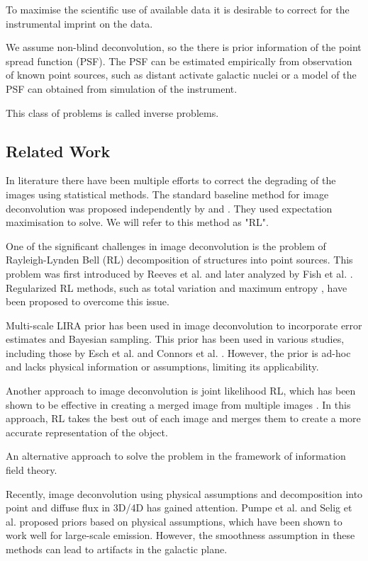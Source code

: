 \documentclass[twocolumn]{aastex631}
\begin{document}
    To maximise the scientific use of available data it is desirable to correct for the instrumental imprint on the data. 
    
    We assume non-blind deconvolution, so the there is prior information of the point spread function (PSF). The PSF can be estimated empirically from observation of known point sources, such as distant activate galactic nuclei or a model of the PSF can obtained from simulation of the instrument. 
    
    This class of problems is called inverse problems.
    
    \subsection{Related Work}
    In literature there have been multiple efforts to correct the degrading of the images using statistical methods.
    The standard baseline method for image deconvolution was proposed independently by \cite{Richardson1972} and \cite{Lucy1974}. They used expectation maximisation to solve. We will refer to this method as "RL". 

    One of the significant challenges in image deconvolution is the problem of Rayleigh-Lynden Bell (RL) decomposition of structures into point sources. This problem was first introduced by Reeves et al. \cite{Reeves1994} and later analyzed by Fish et al. \cite{Fish1995}. Regularized RL methods, such as total variation \citep{Dey2006} and maximum entropy \citep{Bi1994}, have been proposed to overcome this issue.

    Multi-scale LIRA prior has been used in image deconvolution to incorporate error estimates and Bayesian sampling. This prior has been used in various studies, including those by Esch et al. \cite{Esch2004} and Connors et al. \cite{Connors2011}. However, the prior is ad-hoc and lacks physical information or assumptions, limiting its applicability.

    Another approach to image deconvolution is joint likelihood RL, which has been shown to be effective in creating a merged image from multiple images \cite{Ingaramo2014}. In this approach, RL takes the best out of each image and merges them to create a more accurate representation of the object.

    An alternative approach to solve the problem in the framework of information field theory. 
    
    Recently, image deconvolution using physical assumptions and decomposition into point and diffuse flux in 3D/4D has gained attention. Pumpe et al. \cite{Pumpe2018} and Selig et al. \cite{Selig2015} proposed priors based on physical assumptions, which have been shown to work well for large-scale emission. However, the smoothness assumption in these methods can lead to artifacts in the galactic plane.
\end{document}
